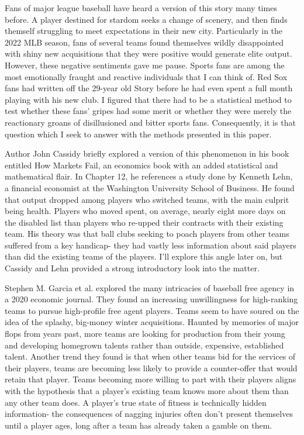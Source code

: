 \documentclass[10pt]{article}
\begin{document}
Fans of major league baseball have heard a version of this story many times before. A player destined for stardom seeks a 
change of scenery, and then finds themself struggling to meet expectations in their new city. Particularly in the 2022 MLB 
season, fans of several teams found themselves wildly disappointed with shiny new acquisitions that they were positive would 
generate elite output. However, these negative sentiments gave me pause. Sports fans are among the most emotionally fraught 
and reactive individuals that I can think of. Red Sox fans had written off the 29-year old Story before he had even spent a 
full month playing with his new club. I figured that there had to be a statistical method to test whether these fans’ gripes 
had some merit or whether they were merely the reactionary groans of disillusioned and bitter sports fans. Consequently, it 
is that question which I seek to answer with the methods presented in this paper. 

Author John Cassidy briefly explored a version of this phenomenon in his book entitled How Markets Fail, an economics book with 
an added statistical and mathematical flair. In Chapter 12, he references a study done by Kenneth Lehn, a financial economist 
at the Washington University School of Business. He found that output dropped among players who switched teams, with the main 
culprit being health. Players who moved spent, on average, nearly eight more days on the disabled list than players who re-upped 
their contracts with their existing team. His theory was that ball clubs seeking to poach players from other teams suffered from 
a key handicap- they had vastly less information about said players than did the existing teams of the players. I’ll explore 
this angle later on, but Cassidy and Lehn provided a strong introductory look into the matter. 

Stephen M. Garcia et al. explored the many intricacies of baseball free agency in a 2020 economic journal. They found an 
increasing unwillingness for high-ranking teams to pursue high-profile free agent players. Teams seem to have soured on the 
idea of the splashy, big-money winter acquisitions. Haunted by memories of major flops from years past, more teams are looking 
for production from their young and developing homegrown talents rather than outside, expensive, established talent. Another 
trend they found is that when other teams bid for the services of their players, teams are becoming less likely to provide a 
counter-offer that would retain that player. Teams becoming more willing to part with their players aligns with the hypothesis 
that a player’s existing team knows more about them than any other team does. A player’s true state of fitness is technically 
hidden information- the consequences of nagging injuries often don’t present themselves until a player ages, long after a team 
has already taken a gamble on them.
\end{document}
